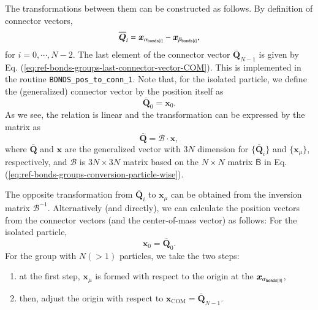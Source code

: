 The transformations between them can be constructed as follows. 
By definition of connector vectors, 
\begin{equation}
  \overline{\bm{Q}}_{i}
  =
  \bm{x}_{\alpha_{{\tt bonds}[i]}} - \bm{x}_{\beta_{{\tt bonds}[i]}},
\end{equation}
for $i = 0, \cdots, N-2$. 
The last element of the connector vector $\overline{\bm{Q}}_{N-1}$ is given by 
Eq. (\ref{eq:ref-bonds-groups-last-connector-vector-COM}). 
This is implemented in the routine {\tt BONDS\_pos\_to\_conn\_1}. 
Note that, for the isolated particle, 
we define the (generalized) connector vector by 
the position itself as 
\begin{equation}
  \overline{\bm{Q}}_{0} = \bm{x}_{0}.
\end{equation}
As we see, the relation is linear and the transformation can be 
expressed by the matrix as 
\begin{equation}
  \overline{\bm{Q}}
  =
  \mathscr{B}\cdot\bm{x},
\end{equation}
where $\overline{\bm{Q}}$ and $\bm{x}$ are the generalized vector 
with $3N$ dimension for $\{\overline{\bm{Q}}_{i}\}$ and $\{\bm{x}_{\mu}\}$, 
respectively, and $\mathscr{B}$ is 
$3N\times 3N$ matrix based on the $N\times N$ matrix $\overline{\mathsf{B}}$ 
in Eq. (\ref{eq:ref-bonds-groups-conversion-particle-wise}). 


The opposite transformation 
from $\overline{\bm{Q}}_{i}$ to $\bm{x}_{\mu}$ can be obtained 
from the inversion matrix $\mathscr{B}^{-1}$. 
Alternatively (and directly), 
we can calculate the position vectors from the connector vectors 
(and the center-of-mass vector) as follows:
For the isolated particle, 
\begin{equation}
  \bm{x}_{0} = \overline{\bm{Q}}_{0}.
\end{equation}
For the group with $N(> 1)$ particles, 
we take the two steps: 
\begin{enumerate}
\item at the first step, $\bm{x}_{\mu}$ is formed
  with respect to the origin at the $\bm{x}_{\alpha_{{\tt bonds}[0]}}$,
\item then, adjust the origin 
  with respect to $\bm{x}_{\text{COM}} = \overline{\bm{Q}}_{N-1}$. 
\end{enumerate}

